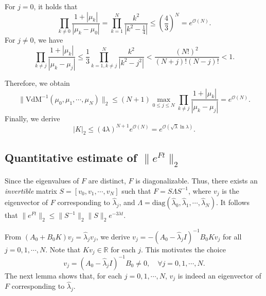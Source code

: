 \documentclass[a4paper]{article}
\numberwithin{equation}{section}
\begin{document}
For $j=0$, it holds that
\begin{equation*}
 \prod_{k\neq 0}\frac{1+|\mu_k|}{|\mu_k-\mu_0|}=\prod_{k=1}^N\frac{k^2}{|k^2-\frac{1}{4}|}\le (\frac{ 4}{3})^{N}=e^{\mathcal{O}(N)}.
\end{equation*}
For $j\neq 0$, we have
\begin{equation*}
\prod_{k\neq j}\frac{1+|\mu_k|}{|\mu_k-\mu_j|}\le \frac{1}{3} \prod_{k=1,k\neq j}^N\frac{k^2}{|k^2-j^2|}< \frac{(N!)^2}{(N+j)!(N-j)!}<1.
\end{equation*}

Therefore, we obtain
\begin{equation*}
\|\text{VdM}^{-1}(\mu_0,\mu_1,\cdots,\mu_N)\|_2\le (N+1)\max_{0\le j\le N}\prod_{k\neq j}\frac{1+|\mu_k|}{|\mu_k-\mu_j|}= e^{\mathcal{O}(N)}.
\end{equation*}
Finally, we derive 
\begin{equation}\label{K-norm}
|K|_2\le (4\lambda)^{N+1}e^{\mathcal{O}(N)}=e^{\mathcal{O}(\sqrt{\lambda}\ln \lambda)}.
\end{equation}

\subsection{Quantitative estimate of $\|e^{Ft}\|_2$}

Since the eigenvalues of $F$ are distinct, $F$ is diagonalizable. Thus, there exists an \textit{invertible} matrix $S=[v_0,v_1,\cdots,v_N]$ such that
$F=S\Lambda S^{-1}$, where $v_j$ is the eigenvector of $F$ corresponding to $\hat{\lambda}_j$, and $\Lambda=\text{diag}(\hat{\lambda}_0,\hat{\lambda}_1,\cdots,\hat{\lambda}_N)$. It follows that $\|e^{Ft}\|_2\le \|S^{-1}\|_2\|S\|_2 e^{-3\lambda t}.$

From $(A_0+B_0K)v_j=\hat{\lambda}_jv_j$, we derive 
$v_j=-(A_0-\hat{\lambda}_jI)^{-1}B_0Kv_j$ for all $j=0,1,\cdots,N$. Note that $Kv_j\in \mathbb{R}$ for each $j$. This motivates the choice
$$v_j=(A_0-\hat{\lambda}_jI)^{-1}B_0\neq 0,\quad\forall j=0,1,\cdots,N.$$ The next lemma shows that, for each $j=0,1,\cdots,N$, $v_j$ is indeed an eigenvector of $F$ corresponding to $\hat{\lambda}_j$.
\end{document}
